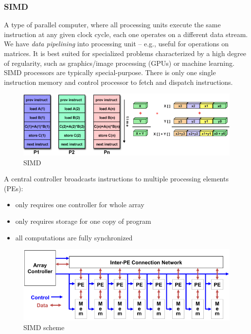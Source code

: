 \subsubsection{SIMD}
A type of parallel computer, where all processing units execute the same instruction at any given clock cycle, each
one operates on a different data stream.
We have \textit{data pipelining} into processing unit -- e.g., useful for operations on matrices.
It is best suited for specialized problems characterized by a high degree of regularity, such as graphics/image
processing (GPUs) or machine learning.
SIMD processors are typically special-purpose.
There is only one single instruction memory and control processor to fetch and dispatch instructions.

\begin{figure}[H]
    \centering
    \includegraphics[scale = 0.3]{images/simd}
    \caption{SIMD}
    \label{fig:simd}
\end{figure}

A central controller broadcasts instructions to
multiple processing elements (PEs):
\begin{itemize}
    \item only requires one controller for whole array
    \item only requires storage for one copy of program
    \item all computations are fully synchronized
\end{itemize}

\begin{figure}[H]
    \centering
    \includegraphics[scale = 0.3]{images/simd-scheme}
    \caption{SIMD scheme}
    \label{fig:simd-scheme}
\end{figure}

